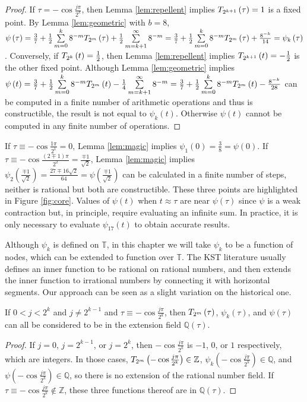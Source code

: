 \begin{proof}
  \leanok
  If $\tau = -\cos\frac{j\pi}{2^k}$, then Lemma \ref{lem:repellent} implies $T_{2^{k + 1}}\left(\tau\right) = 1$ is a fixed point. By Lemma \ref{lem:geometric} with $b = 8$, $\psi\left(\tau\right) = \frac{3}{7} + \frac{1}{2} \sum\limits_{m = 0}^{k} 8^{-m} T_{2^{m}}\left(\tau\right) + \frac{1}{2}\sum\limits_{m = k + 1}^\infty 8^{-m} = \frac{3}{7} + \frac{1}{2} \sum\limits_{m = 0}^{k} 8^{-m} T_{2^{m}}\left(\tau\right) + \frac{8^{-k}}{14} = \psi_k\left(\tau\right)$. Conversely, if $T_{2^{k}}\left(t\right) = \frac{1}{2}$, then Lemma \ref{lem:repellent} implies $T_{2^{k + 1}}\left(t\right) = -\frac{1}{2}$ is the other fixed point. Although Lemma \ref{lem:geometric} implies $\psi\left(t\right) = \frac{3}{7} + \frac{1}{2} \sum\limits_{m = 0}^{k} 8^{-m} T_{2^{m}}\left(t\right) - \frac{1}{4}\sum\limits_{m = k + 1}^\infty 8^{-m} = \frac{3}{7} + \frac{1}{2} \sum\limits_{m = 0}^{k} 8^{-m} T_{2^{m}}\left(t\right) - \frac{8^{-k}}{28}$ can be computed in a finite number of arithmetic operations and thus is constructible, the result is not equal to $\psi_k\left(t\right)$. Otherwise $\psi\left(t\right)$ cannot be computed in any finite number of operations.
\end{proof}
\noindent If $\tau \equiv -\cos \frac{1\pi}{2^1} = 0$, Lemma \ref{lem:magic} implies $\psi_1\left(0\right) = \frac{3}{8} = \psi\left(0\right)$. If $\tau \equiv -\cos\frac{\left(2 \mp 1\right)\pi}{2^2} = \frac{\mp 1}{\sqrt{2}}$, Lemma \ref{lem:magic} implies $\psi_2\left(\frac{\mp 1}{\sqrt{2}}\right) = \frac{27 \mp 16 \sqrt{2}}{64} = \psi\left(\frac{\mp 1}{\sqrt{2}}\right)$ can be calculated in a finite number of steps, neither is rational but both are constructible. These three points are highlighted in Figure \ref{fig:core}. Values of $\psi\left(t\right)$ when $t \approx \tau$ are near $\psi\left(\tau\right)$ since $\psi$ is a weak contraction but, in principle, require evaluating an infinite sum. In practice, it is only necessary to evaluate $\psi_{17}\left(t\right)$ to obtain accurate results.

Although $\psi_k$ is defined on $\mathbb{T}$, in this chapter we will take $\psi_k$ to be a function of nodes, which can be extended to function over $\mathbb{T}$. The KST literature usually defines an inner function to be rational on rational numbers, and then extends the inner function to irrational numbers by connecting it with horizontal segments. Our approach can be seen as a slight variation on the historical one.
\begin{lemma}
  \label{lem:extension}
  \leanok
  If $0 < j < 2^k$ and $j \neq 2^{k - 1}$ and $\tau \equiv -\cos\frac{j\pi}{2^k}$, then $T_{2^{m}}\left(\tau\right)$, $\psi_k\left(\tau\right)$, and $\psi\left(\tau\right)$ can all be considered to be in the extension field $\mathbb{Q}\left(\tau\right)$.
\end{lemma}
\begin{proof}
  \leanok
  If $j = 0$, $j = 2^{k - 1}$, or $j = 2^k$, then $-\cos\frac{j\pi}{2^k}$ is $-1$, $0$, or $1$ respectively, which are integers. In those cases, $T_{2^{m}}\left(-\cos\frac{j\pi}{2^k}\right) \in \mathbb{Z}$, $\psi_k\left(-\cos\frac{j\pi}{2^k}\right) \in \mathbb{Q}$, and $\psi\left(-\cos\frac{j\pi}{2^k}\right) \in \mathbb{Q}$, so there is no extension of the rational number field. If $\tau \equiv -\cos\frac{j\pi}{2^k} \notin \mathbb{Z}$, these three functions thereof are in $\mathbb{Q}\left(\tau\right)$.
\end{proof}

